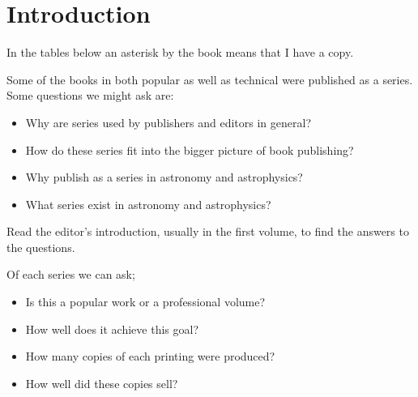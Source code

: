 \section{Introduction}

In the tables below an asterisk by the book means that I have a copy.

Some of the books in  both popular as well as technical were published
as a series. Some questions we might ask are:

\begin{itemize}
  \item Why are series used by publishers and editors in general?
  \item How do these series fit into the bigger picture of book publishing?
  \item Why publish as a series in astronomy and astrophysics?
  \item What series exist in astronomy and astrophysics?
\end{itemize}

Read the editor's introduction, usually in the first volume, to
find the answers to the questions.
  
Of each series we can ask;

\begin{itemize}
  \item Is this a popular work or a professional volume?
  \item How well does it achieve this goal?
  \item How many copies of each printing were produced?
  \item How well did these copies sell?
\end{itemize}
